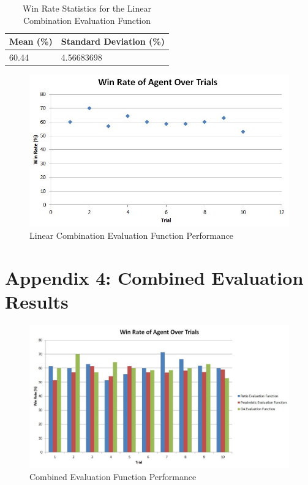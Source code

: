 \documentclass[12pt]{article}
\begin{document}
\begin{table}[h]
\centering
\caption{Win Rate Statistics for the Linear Combination Evaluation Function}
\label{ratio-stats}
\begin{tabular}{@{}|l|l|@{}}
\toprule
Mean (\%)& Standard Deviation (\%) \\ \midrule
60.44           & 4.56683698
\\ \bottomrule
\end{tabular}
\end{table}

\begin{figure}[htbp]
\centering
\caption{Linear Combination Evaluation Function Performance}
\includegraphics[scale=0.9]{linear-combination-evaluation-function-results.JPG}
\end{figure}

\clearpage
\section{Appendix 4: Combined Evaluation Results}
\begin{figure}[htbp]
\centering
\caption{Combined Evaluation Function Performance}
\includegraphics[scale=0.6]{combined-evaluation-function.JPG}
\end{figure}
\end{document}
